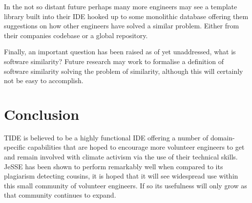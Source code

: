 \documentclass[jou,apacite]{apa6}
\begin{document}
In the not so distant future perhaps many more engineers may see a template library built into their IDE hooked up to some monolithic database offering them suggestions on how other engineers have solved a similar problem. Either from their companies codebase or a global repository.

Finally, an important question has been raised as of yet unaddressed, what is software similarity? Future research may work to formalise a definition of software similarity solving the problem of similarity, although this will certainly not be easy to accomplish. 

\section{Conclusion}
TIDE is believed to be a highly functional IDE offering a number of domain-specific capabilities that are hoped to encourage more volunteer engineers to get and remain involved with climate activism via the use of their technical skills. JeSSE has been shown to perform remarkably well when compared to its plagiarism detecting cousins, it is hoped that it will see widespread use within this small community of volunteer engineers. If so its usefulness will only grow as that community continues to expand. 


\end{document}
